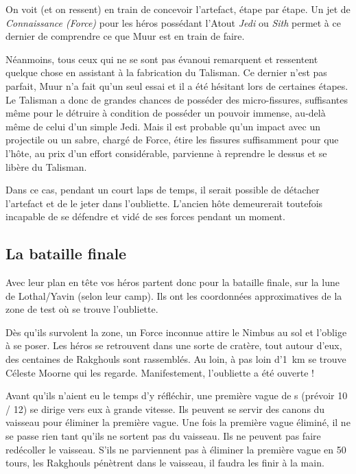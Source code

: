 On voit (et on ressent)  en train de concevoir l’artefact, étape par étape. Un jet de \textit{Connaissance (Force)} pour les héros possédant l’Atout \textit{Jedi} ou \textit{Sith} permet à ce dernier de comprendre ce que Muur est en train de faire.

Néanmoins, tous ceux qui ne se sont pas évanoui remarquent et ressentent quelque chose en assistant à la fabrication du Talisman. Ce dernier n’est pas parfait, Muur n’a fait qu’un seul essai et il a été hésitant lors de certaines étapes. Le Talisman a donc de grandes chances de posséder des micro-fissures, suffisantes même pour le détruire à condition de posséder un pouvoir immense, au-delà même de celui d’un simple Jedi. Mais il est probable qu’un impact avec un projectile ou un sabre, chargé de Force, étire les fissures suffisamment pour que l’hôte, au prix d’un effort considérable, parvienne à reprendre le dessus et se libère du Talisman.

Dans ce cas, pendant un court laps de temps, il serait possible de détacher l’artefact et de le jeter dans l’oubliette. L’ancien hôte demeurerait toutefois incapable de se défendre et vidé de ses forces pendant un moment.

\subsection{La bataille finale}
Avec leur plan en tête vos héros partent donc pour la bataille finale, sur la lune de Lothal/Yavin (selon leur camp). Ils ont les coordonnées approximatives de la zone de test où se trouve l’oubliette. 

Dès qu’ils survolent la zone, un Force inconnue attire le Nimbus au sol et l’oblige à se poser. Les héros se retrouvent dans une sorte de cratère, tout autour d’eux, des centaines de Rakghouls sont rassemblés. Au loin, à pas loin d’1~km se trouve Céleste Moorne qui les regarde. Manifestement, l’oubliette a été ouverte !

Avant qu’ils n’aient eu le temps d’y réfléchir, une première vague de s (prévoir 10 / 12) se dirige vers eux à grande vitesse. Ils peuvent se servir des canons du vaisseau pour éliminer la première vague. Une fois la première vague éliminé, il ne se passe rien tant qu’ils ne sortent pas du vaisseau. Ils ne peuvent pas faire redécoller le vaisseau. S’ils ne parviennent pas à éliminer la première vague en 50 tours, les Rakghouls pénètrent dans le vaisseau, il faudra les finir à la main.

